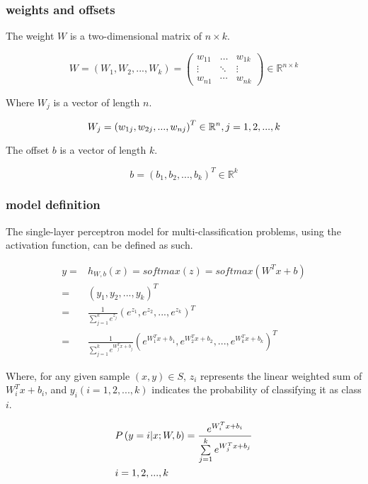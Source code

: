 \begin{content}
\begin{content}
\subsubsection{weights and offsets}

The weight $W$ is a two-dimensional matrix of $n \times k$.

\[
W = \left( {{W_1},{W_2},...,{W_k}} \right) = \left( {\begin{array}{*{20}{c}}
  {{w_{11}}}& \ldots &{{w_{1k}}} \\ 
   \vdots & \ddots & \vdots \\ 
  {{w_{n1}}}& \cdots &{{w_{nk}}} 
\end{array}} \right) \in {\mathbb{R}^{n \times k}}
\]

Where $W_j$ is a vector of length $n$.

\[
{W_j} = {\left( {{w_{1j}},{w_{2j}},...,{w_{nj}}} \right)^T} \in {\mathbb{R}^n }, j = 1,2,...,k \\
\]

The offset $b$ is a  vector of length $k$.

\[
b = {({b_1},{b_2},...,{b_k})^T} \in {\mathbb{R}^k}
\]

\subsubsection{model definition}

The single-layer perceptron model for multi-classification problems, using the  activation function, can be defined as such.

\[\begin{aligned}
  y = & {h_{W,b}}(x) = softmax (z) = softmax ({W^T}x + b) \\ 
   = & {\left( {{y_1},{y_2},...,{y_k}} \right)^T} \\ 
   = & \frac{1}{{\sum\limits_{j = 1}^k {{e^{{z_j}}}} }}{\left( {{e^{{z_1}}},{e ^{{z_2}}},...,{e^{{z_k}}}} \right)^T} \\ 
   = & \frac{1}{{\sum\limits_{j = 1}^k {{e^{W_j^Tx + {b_j}}}} }}{\left( {{e^{W_1^Tx + {b_1}}},{e^{W_2^Tx + {b_2}}},...,{e^{W_k^Tx + {b_k}}}} \right)^T} \ 
\end{aligned} \]

Where, for any given sample $ (x, y) \in S $, $ z_i $ represents the linear weighted sum of $W_i^Tx+b_i$, and $y_i(i=1,2,...,k )$ indicates the probability of classifying it as class $i$.

\[\begin{gathered}
  P\left( {y = i|x;W,b} \right) = \frac{{{e^{W_i^Tx + b_i}}}}{{\sum\limits_{j = 1}^k { {e^{W_j^Tx + b_j}}} }} \hfill \\
  i = 1,2,...,k \hfill \\ 
\end{gathered} \]



\end{content}
\end{content}
